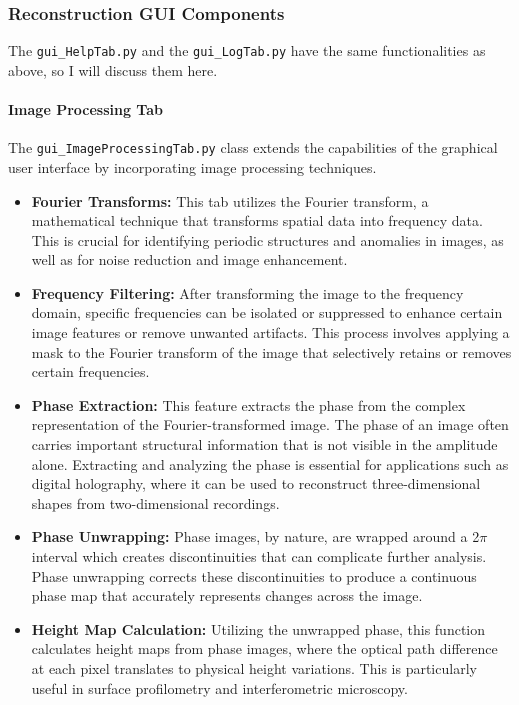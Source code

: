 \documentclass[../main.tex]{subfiles}
\begin{document}
\subsubsection{Reconstruction GUI Components}

The \texttt{gui\_HelpTab.py} and the \texttt{gui\_LogTab.py} have the same functionalities as above, so I will discuss them here.

\paragraph{Image Processing Tab}
The \texttt{gui\_ImageProcessingTab.py} class extends the capabilities of the graphical user interface by incorporating image processing techniques.

\begin{itemize}
    \item \textbf{Fourier Transforms:} This tab utilizes the Fourier transform, a mathematical technique that transforms spatial data into frequency data. This is crucial for identifying periodic structures and anomalies in images, as well as for noise reduction and image enhancement.
    
    \item \textbf{Frequency Filtering:} After transforming the image to the frequency domain, specific frequencies can be isolated or suppressed to enhance certain image features or remove unwanted artifacts. This process involves applying a mask to the Fourier transform of the image that selectively retains or removes certain frequencies.
    
    \item \textbf{Phase Extraction:} This feature extracts the phase from the complex representation of the Fourier-transformed image. The phase of an image often carries important structural information that is not visible in the amplitude alone. Extracting and analyzing the phase is essential for applications such as digital holography, where it can be used to reconstruct three-dimensional shapes from two-dimensional recordings.
    
    \item \textbf{Phase Unwrapping:} Phase images, by nature, are wrapped around a 2$\pi$ interval which creates discontinuities that can complicate further analysis. Phase unwrapping corrects these discontinuities to produce a continuous phase map that accurately represents changes across the image.
    
    \item \textbf{Height Map Calculation:} Utilizing the unwrapped phase, this function calculates height maps from phase images, where the optical path difference at each pixel translates to physical height variations. This is particularly useful in surface profilometry and interferometric microscopy.
    

\end{itemize}
\end{document}
